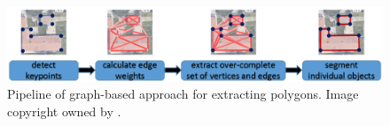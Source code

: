 \begin{figure}[!h]
	\centering
	\includegraphics[width=\fig\textwidth]{2-07.png}
    \caption[Pipeline of graph-based approach for extracting polygons]{Pipeline of graph-based approach for extracting polygons. Image copyright owned by \cite{msnadine}.}
    \label{fig:graphbased}
\end{figure}